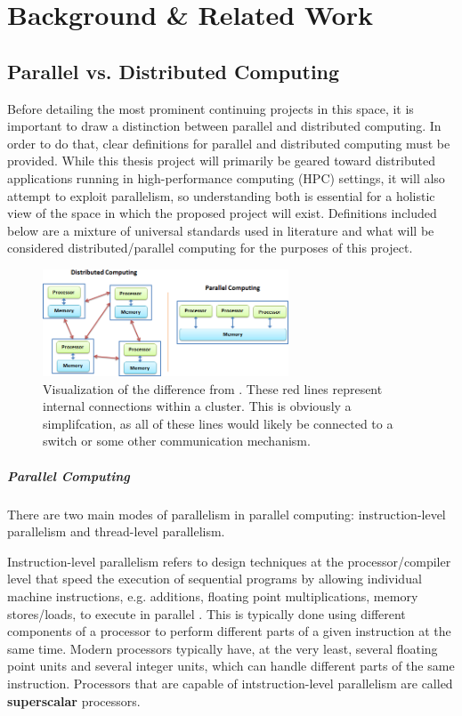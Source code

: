 \chapter{Background \& Related Work}

\section{Parallel vs. Distributed Computing}
Before detailing the most prominent continuing projects in this space, it is important to draw a distinction between parallel and distributed computing. In order to do that, clear definitions for parallel and distributed computing must be provided. While this thesis project will primarily be geared toward distributed applications running in high-performance computing (HPC) settings, it will also attempt to exploit parallelism, so understanding both is essential for a holistic view of the space in which the proposed project will exist. Definitions included below are a mixture of universal standards used in literature and what will be considered distributed/parallel computing for the purposes of this project.

\begin{figure}[h]
\centering
\includegraphics[width=0.65\textwidth]{Figures/parallel_vs_distributed.png}
\caption{Visualization of the difference from \cite{dist_java}. These red lines represent internal connections within a cluster. This is obviously a simplifcation, as all of these lines would likely be connected to a switch or some other communication mechanism.}
\label{fig:dist_v_parallel}
\end{figure}

\paragraph{Parallel Computing}
There are two main modes of parallelism in parallel computing: instruction-level parallelism and thread-level parallelism. 

Instruction-level parallelism refers to design techniques at the processor/compiler level that speed the execution of sequential programs by allowing individual machine instructions, e.g. additions, floating point multiplications, memory stores/loads, to execute in parallel \cite{ilp_history}. This is typically done using different components of a processor to perform different parts of a given instruction at the same time. Modern processors typically have, at the very least, several floating point units and several integer units, which can handle different parts of the same instruction. Processors that are capable of intstruction-level parallelism are called \textbf{superscalar} processors.

